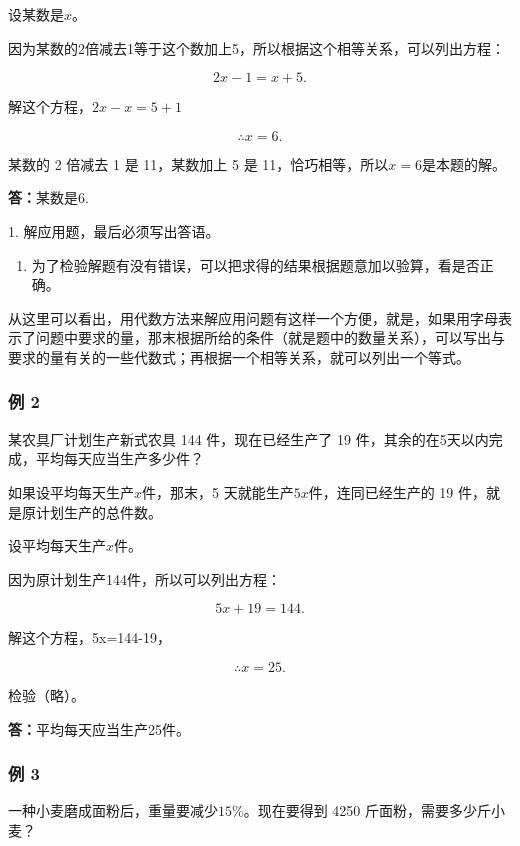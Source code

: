  设某数是\(x\)。

因为某数的2倍减去1等于这个数加上5，所以根据这个相等关系，可以列出方程：

\[
2 x - 1 = x + 5.
\]

解这个方程，\(2x - x = 5 + 1\)

\[
\therefore x = 6.
\]

 某数的 2 倍减去 1 是 11，某数加上 5 是
11，恰巧相等，所以\(x = 6\)是本题的解。

\textbf{答：}某数是6.

 1. 解应用题，最后必须写出答语。

\begin{enumerate}[start=2]
\item
  为了检验解题有没有错误，可以把求得的结果根据题意加以验算，看是否正确。
\end{enumerate}

从这里可以看出，用代数方法来解应用问题有这样一个方便，就是，如果用字母表示了问题中要求的量，那末根据所给的条件（就是题中的数量关系），可以写出与要求的量有关的一些代数式；再根据一个相等关系，就可以列出一个等式。

\subsubsection{例 2}

某农具厂计划生产新式农具 144 件，现在已经生产了 19
件，其余的在5天以内完成，平均每天应当生产多少件？

 如果设平均每天生产\(x\)件，那末，5
天就能生产\(5x\)件，连同已经生产的 19 件，就是原计划生产的总件数。

 设平均每天生产\(x\)件。

因为原计划生产144件，所以可以列出方程：

\[
5 x + 19 = 144.
\]

解这个方程，5x=144-19，

\[
\therefore x = 25.
\]

检验（略）。

\textbf{答：}平均每天应当生产25件。

\subsubsection{例 3}

一种小麦磨成面粉后，重量要减少\(15\%\)。现在要得到 4250
斤面粉，需要多少斤小麦？

